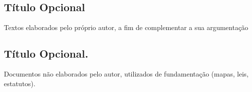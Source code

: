\documentclass[
	12pt,				%
	openright,			%
	oneside,			%
	a4paper,			%
	english,			%
	brazil				%
	]{abntex2}
\begin{document}
\postextual





\begin{apendicesenv}

\chapter{Título Opcional}
Textos elaborados pelo próprio autor, a fim de complementar a sua argumentação

\end{apendicesenv}



\begin{anexosenv}

\chapter{Título Opcional.}
Documentos não elaborados pelo autor, utilizados de fundamentação (mapas, leis, estatutos).

\end{anexosenv}

\printindex
\end{document}
